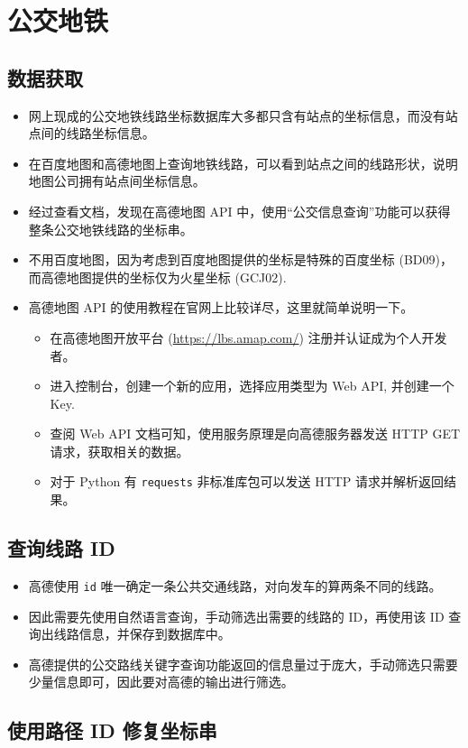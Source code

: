\section{公交地铁}
\subsection{数据获取}
\begin{itemize}
	\item 网上现成的公交地铁线路坐标数据库大多都只含有站点的坐标信息，而没有站点间的线路坐标信息。
	\item 在百度地图和高德地图上查询地铁线路，可以看到站点之间的线路形状，说明地图公司拥有站点间坐标信息。
	\item 经过查看文档，发现在高德地图 API 中，使用``公交信息查询''功能可以获得整条公交地铁线路的坐标串。
	\item 不用百度地图，因为考虑到百度地图提供的坐标是特殊的百度坐标 (BD09)，而高德地图提供的坐标仅为火星坐标 (GCJ02).
	\item 高德地图 API 的使用教程在官网上比较详尽，这里就简单说明一下。
	\begin{itemize}
		\item 在高德地图开放平台 (\url{https://lbs.amap.com/}) 注册并认证成为个人开发者。
		\item 进入控制台，创建一个新的应用，选择应用类型为 Web API, 并创建一个 Key.
		\item 查阅 Web API 文档可知，使用服务原理是向高德服务器发送 HTTP GET 请求，获取相关的数据。
		\item 对于 Python 有 \verb|requests| 非标准库包可以发送 HTTP 请求并解析返回结果。
	\end{itemize}
\end{itemize}

\subsection{查询线路 ID}
\begin{itemize}
	\item 高德使用 \verb|id| 唯一确定一条公共交通线路，对向发车的算两条不同的线路。
	\item 因此需要先使用自然语言查询，手动筛选出需要的线路的 ID，再使用该 ID 查询出线路信息，并保存到数据库中。
	\item 高德提供的公交路线关键字查询功能返回的信息量过于庞大，手动筛选只需要少量信息即可，因此要对高德的输出进行筛选。
\end{itemize}

\subsection{使用路径 ID 修复坐标串}


